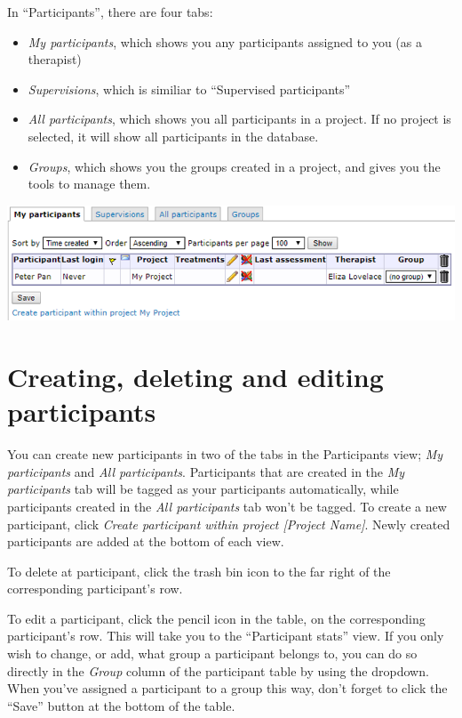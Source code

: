 \documentclass[]{book}
\providecommand{\tightlist}{%
  \setlength{\itemsep}{0pt}\setlength{\parskip}{0pt}}
\begin{document}
In ``Participants'', there are four tabs:

\begin{itemize}
\tightlist
\item
  \emph{My participants}, which shows you any participants assigned to you (as a therapist)
\item
  \emph{Supervisions}, which is similiar to ``Supervised participants''
\item
  \emph{All participants}, which shows you all participants in a project. If no project is selected, it will show all participants in the database.
\item
  \emph{Groups}, which shows you the groups created in a project, and gives you the tools to manage them.
\end{itemize}

\includegraphics{images/new-images/participantsTabs.png}

\hypertarget{creating-deleting-and-editing-participants}{%
\section{Creating, deleting and editing participants}\label{creating-deleting-and-editing-participants}}

You can create new participants in two of the tabs in the Participants view; \emph{My participants} and \emph{All participants}. Participants that are created in the \emph{My participants} tab will be tagged as your participants automatically, while participants created in the \emph{All participants} tab won't be tagged.
To create a new participant, click \emph{Create participant within project {[}Project Name{]}}. Newly created participants are added at the bottom of each view.

To delete at participant, click the trash bin icon to the far right of the corresponding participant's row.

To edit a participant, click the pencil icon in the table, on the corresponding participant's row. This will take you to the ``Participant stats'' view.
If you only wish to change, or add, what group a participant belongs to, you can do so directly in the \emph{Group} column of the participant table by using the dropdown. When you've assigned a participant to a group this way, don't forget to click the ``Save'' button at the bottom of the table.
\end{document}
